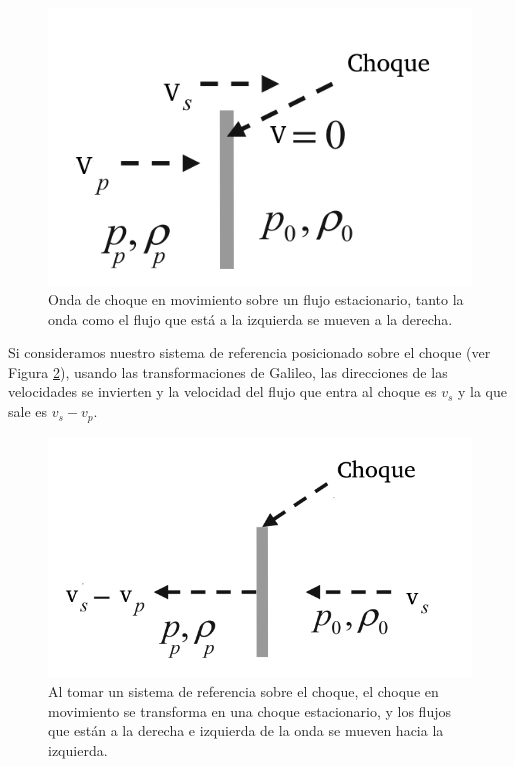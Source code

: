 \documentclass[12pt,a4paper]{book}
\begin{document}
\begin{figure}
  \centering
  \includegraphics[scale=0.7]{./Figuras/capitulo_2/move_shock.png}
  \caption{Onda de choque en movimiento sobre un flujo estacionario, tanto la onda como el flujo que está a la izquierda se mueven a la derecha.}\label{fig_move_shock}
\end{figure}
  

Si consideramos nuestro sistema de referencia posicionado sobre el choque (ver Figura \ref{fig:choque:estacionario}), usando las transformaciones de Galileo, las direcciones de las velocidades
se invierten y la velocidad del flujo que entra al choque es $v_s$ y la que sale es $v_s-v_p$.

\begin{figure} 
  \centering
  \includegraphics[scale=0.7]{./Figuras/capitulo_2/stationary_shock.png}
  \caption{Al tomar un sistema de referencia sobre el choque, el choque en movimiento se transforma en una choque estacionario, y los
  flujos que están a la derecha e izquierda de la onda se mueven hacia la izquierda.} \label{fig:choque:estacionario}
\end{figure}
\end{document}
